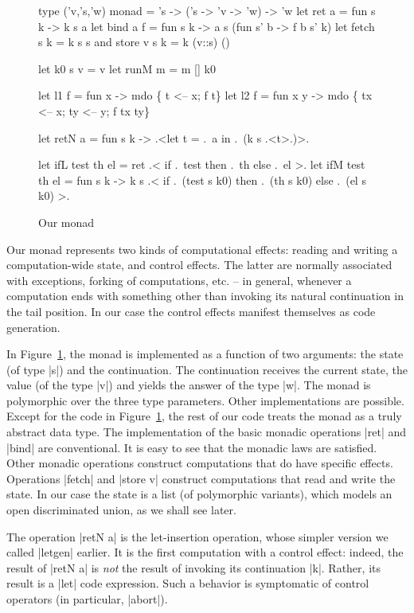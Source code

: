 \documentclass{llncs}
\begin{document}
\begin{figure}\label{ourmonad}
\begin{code}
type ('v,'s,'w) monad = 's -> ('s -> 'v -> 'w) -> 'w
let ret a = fun s k -> k s a
let bind a f = fun s k -> a s (fun s' b -> f b s' k)
let fetch s k = k s s  and  store v s k = k (v::s) ()

let k0 s v = v
let runM m = m [] k0

let l1 f = fun x -> mdo \{ t <-- x; f t\}
let l2 f = fun x y -> mdo \{ tx <-- x; ty <-- y; f tx ty\}

let retN a = fun s k -> .<let t = .~a in .~(k s .<t>.)>.

let ifL test th el = ret .< if .~test then .~th else .~el >.
let ifM test th el = fun s k ->
  k s .< if .~(test s k0) then .~(th s k0) else .~(el s k0) >.
\end{code}
\caption{Our monad}
\end{figure}

Our monad represents two kinds of computational effects: reading and
writing a computation-wide state, and control effects. The latter are
normally associated with exceptions, forking of computations, etc. --
in general, whenever a computation ends with something other than
invoking its natural continuation in the tail position. In our case
the control effects manifest themselves as code generation.

In Figure~\ref{ourmonad}, the monad is implemented as a function of two
arguments: the state (of type |s|) and the continuation. The
continuation receives the current state, the value (of the type |v|) and
yields the answer of the type |w|.  The monad is polymorphic over the
three type parameters.  Other implementations are
possible. Except for the code in Figure~\ref{ourmonad}, the rest of our code
treats the monad as a truly abstract data type. The implementation of
the basic
monadic operations |ret| and |bind| are conventional. It is easy to
see that the monadic laws are satisfied.  Other monadic operations
construct computations that do have specific effects.  Operations |fetch| and
|store v| construct computations that read and write the state. In our
case the state is a list (of polymorphic variants), which models an
open discriminated union, as we shall see later.

The operation |retN a| is the let-insertion operation, whose simpler
version we called |letgen| earlier. It is the first computation with
a control effect: indeed, the result of |retN a| is \emph{not} the
result of invoking its continuation |k|. Rather, its result is a |let|
code expression. Such a behavior is symptomatic of control operators
(in particular, |abort|).
\end{document}
